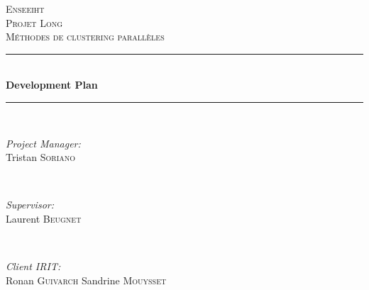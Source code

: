 \documentclass[12pt]{article} %
\begin{document}

\begin{titlepage}

\newcommand{\HRule}{\rule{\linewidth}{0.5mm}} %

\center %

\textsc{\LARGE Enseeiht}\\[1.5cm] %
\textsc{\Large Projet Long}\\[0.5cm] %
\textsc{\large Méthodes de clustering parallèles}\\[0.5cm] %

\HRule \\[0.4cm]
{ \huge \bfseries Development Plan}\\[0.4cm] %
\HRule \\[1.5cm]

\begin{minipage}{0.4\textwidth}
\begin{flushleft} \large
\emph{Project Manager:}\\
Tristan \textsc{Soriano} %
\end{flushleft}
\end{minipage}
~
\begin{minipage}{0.4\textwidth}
\begin{flushright} \large
\emph{Supervisor:} \\
Laurent \textsc{Beugnet} %
\end{flushright}
\end{minipage}\\[4cm]

\begin{minipage}{0.4\textwidth}
\begin{flushleft} \large
\emph{Client IRIT:}\\
Ronan \textsc{Guivarch} %
Sandrine \textsc{Mouysset}
\end{flushleft}
\end{minipage}






\end{titlepage}
\end{document}
